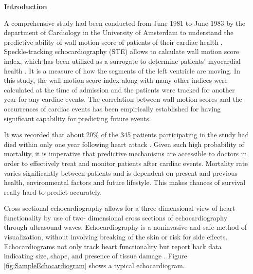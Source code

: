 \documentclass[11pt]{article}
\begin{document}
\newpage
{\bf Introduction}

A comprehensive study had been conducted from June 1981 to June 1983 by the department of Cardiology in the University of Amsterdam to understand the predictive ability of wall motion score of patients  of their cardiac health \cite{gerard}. Speckle-tracking echocardiography (STE) allows to calculate wall motion score index, which has been utilized as a surrogate to determine patients’ myocardial health \cite{nesser}. It is a measure of how the segments of the left ventricle are moving. In this study, the wall motion score index along with many other indices were calculated at the time of admission and the patients were tracked for another year for any cardiac events. The correlation between wall motion scores and the occurrences of cardiac events has been empirically established for having significant capability for predicting future events. 

It was recorded that about 20\% of the 345 patients participating in the study had died within only one year following heart attack \cite{gerard}. Given such high probability of mortality, it is imperative that predictive mechanisms are accessible to doctors in order to effectively treat and monitor patients after cardiac events. Mortality rate varies significantly between patients and is dependent on present and previous health, environmental factors and future lifestyle. This makes chances of survival really hard to predict accurately. 

Cross sectional echocardiography allows for a three dimensional view of heart functionality by use of two- dimensional cross sections of echocardiography through ultrasound waves. Echocardiography is a noninvasive and safe method of visualization, without involving breaking of the skin or risk for side effects. Echocardiograms not only track heart functionality but report back data indicating size, shape, and presence of tissue damage \cite{echo}. Figure \ref{fig:SampleEchocardiogram} shows a typical echocardiogram.
\end{document}

